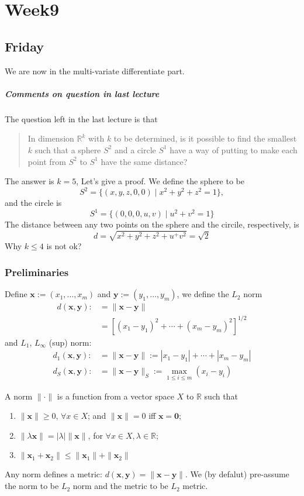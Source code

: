 \chapter{Week9}
\section{Friday}
We are now in the multi-variate differentiate part. 
\paragraph{Comments on question in last lecture}
The question left in the last lecture is that
\begin{quotation}
In dimension $\mathbb{R}^k$ with $k$ to be determined, is it possible to find the smallest $k$ such that a sphere $S^2$ and a circle $S^1$ have a way of putting to make each point from $S^2$ to $S^1$ have the same distance?
\end{quotation}
The answer is $k=5$, Let's give a proof. We define the sphere to be 
\[
S^2=\{(x,y,z,0,0)\mid x^2+y^2+z^2=1\},
\]
and the circle is 
\[
S^1=\{(0,0,0,u,v)\mid u^2+v^2=1\}
\]
The distance between any two points on the sphere and the circile, respectively, is
\[
d=\sqrt{x^2+y^2+z^2+u^+v^2}=\sqrt{2}
\]
Why $k\le 4$ is not ok?
\subsection{Preliminaries}
Define $\bm x:=(x_1,\dots,x_m)$ and $\bm y:=(y_1,\dots,y_m)$, we define the $L_2$ norm
\begin{align*}
d(\bm x,\bm y):&=\|\bm x-\bm y\|\\
&=\left[(x_1-y_1)^2+\cdots+(x_m-y_m)^2\right]^{1/2}
\end{align*}
and $L_1$, $L_{\infty}$ (sup) norm:
\begin{align*}
d_1(\bm x,\bm y):&=\|\bm x-\bm y\|:=|x_1-y_1|+\cdots+|x_m-y_m|\\
d_S(\bm x,\bm y):&=\|\bm x-\bm y\|_S:=\max_{1\le i\le m}(x_i-y_i)
\end{align*}
\begin{definition}[Norm]
A norm $\|\cdot\|$ is a function from a vector space $X$ to $\mathbb{R}$ such that
\begin{enumerate}
\item
$\|\bm x\|\ge0$, $\forall x\in X$; and $\|\bm x\|=0$ iff $\bm x=\bm0$;
\item
$\|\lambda\bm x\| = |\lambda|\|\bm x\|$, for $\forall x\in X,\lambda\in\mathbb{R}$;
\item
$\|\bm x_1+\bm x_2\|\le \|\bm x_1\| + \|\bm x_2\|$
\end{enumerate}
\end{definition}
\begin{remark}
Any norm defines a metric: $d(\bm x,\bm y)=\|\bm x-\bm y\|$. We (by defalut) pre-assume the norm to be $L_2$ norm and the metric to be $L_2$ metric.
\end{remark}

